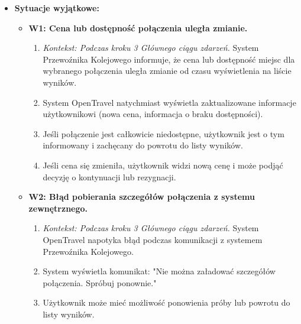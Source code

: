 \documentclass[a4paper,12pt]{article}
\begin{document}
\begin{itemize}
\begin{itemize}
\end{itemize}
\item \textbf{Sytuacje wyjątkowe:}
\begin{itemize}
\item \textbf{W1: Cena lub dostępność połączenia uległa zmianie.}
\begin{enumerate}
\item \textit{Kontekst: Podczas kroku 3 Głównego ciągu zdarzeń.} System Przewoźnika Kolejowego informuje, że cena lub dostępność miejsc dla wybranego połączenia uległa zmianie od czasu wyświetlenia na liście wyników.
\item System OpenTravel natychmiast wyświetla zaktualizowane informacje użytkownikowi (nowa cena, informacja o braku dostępności).
\item Jeśli połączenie jest całkowicie niedostępne, użytkownik jest o tym informowany i zachęcany do powrotu do listy wyników.
\item Jeśli cena się zmieniła, użytkownik widzi nową cenę i może podjąć decyzję o kontynuacji lub rezygnacji.
\end{enumerate}
\item \textbf{W2: Błąd pobierania szczegółów połączenia z systemu zewnętrznego.}
\begin{enumerate}
\item \textit{Kontekst: Podczas kroku 3 Głównego ciągu zdarzeń.} System OpenTravel napotyka błąd podczas komunikacji z systemem Przewoźnika Kolejowego.
\item System wyświetla komunikat: "Nie można załadować szczegółów połączenia. Spróbuj ponownie."
\item Użytkownik może mieć możliwość ponowienia próby lub powrotu do listy wyników.
\end{enumerate}
\end{itemize}
\end{itemize}
\end{document}
